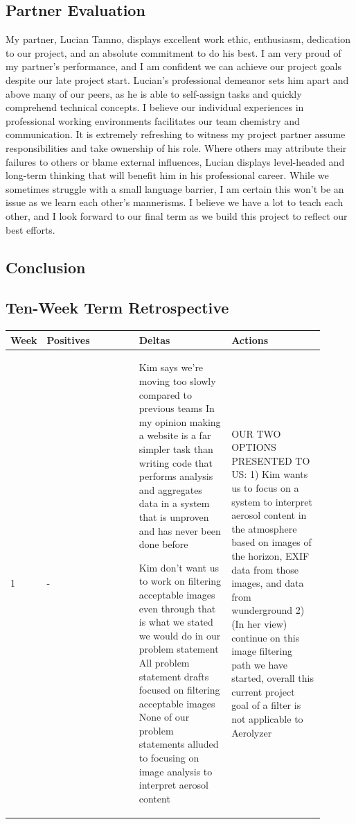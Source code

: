 \documentclass[onecolumn, draftclsnofoot,10pt, compsoc]{IEEEtran}
\begin{document}
\begin{singlespace}
	\subsection{Partner Evaluation}
		My partner, Lucian Tamno, displays excellent work ethic, enthusiasm, dedication to our project, and an absolute commitment to do his best.
		I am very proud of my partner's performance, and I am confident we can achieve our project goals despite our late project start.
		Lucian's professional demeanor sets him apart and above many of our peers, as he is able to self-assign tasks and quickly comprehend technical concepts.
		I believe our individual experiences in professional working environments facilitates our team chemistry and communication.
		It is extremely refreshing to witness my project partner assume responsibilities and take ownership of his role.
		Where others may attribute their failures to others or blame external influences, Lucian displays level-headed and long-term thinking that will benefit him in his professional career.
		While we sometimes struggle with a small language barrier, I am certain this won't be an issue as we learn each other's mannerisms.
		I believe we have a lot to teach each other, and I look forward to our final term as we build this project to reflect our best efforts.

	\subsection{Conclusion}
	

	\clearpage

	\subsection{Ten-Week Term Retrospective}
		\begin{longtable}{|l|p{0.3\linewidth}|p{0.3\linewidth}|p{0.3\linewidth}|}\hline \textbf{Week} & \textbf{Positives} & \textbf{Deltas} & \textbf{Actions}\\\hline
		1 	&
			-
			&
				Kim says we're moving too slowly compared to previous teams
				In my opinion making a website is a far simpler task than writing code that performs analysis  and aggregates data in a system that is unproven and has never been done before

				Kim don't want us to work on filtering acceptable images even through that is what we stated we would do in our problem statement
				All problem statement drafts focused on filtering acceptable images
				None of our problem statements alluded to focusing on image analysis to interpret aerosol content
			&
				OUR TWO OPTIONS PRESENTED TO US:
				1) Kim wants us to focus on a system to interpret aerosol content in the atmosphere based on images of the horizon, EXIF data from those images, and data from wunderground
				2) (In her view) continue on this image filtering path we have started, overall this current project goal of a filter is not applicable to Aerolyzer


\end{longtable}
\end{singlespace}
\end{document}
